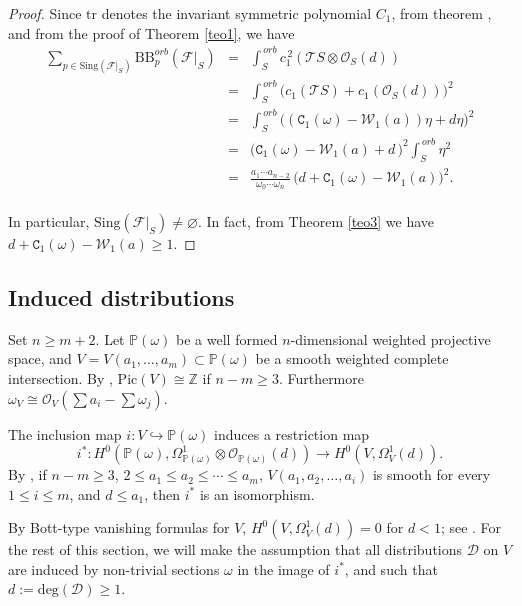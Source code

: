 \documentclass[11pt]{amsart}
\theoremstyle{plain}
\theoremstyle{definition}
\begin{document}
\begin{proof} 
Since $\mathrm{tr}$ denotes the invariant symmetric polynomial $C_1$,
from theorem \cite[Theorem 1]{Mig}, and from the proof of Theorem \ref{teo1}, we have 
\begin{eqnarray*}
\sum_{p\in\mathrm{Sing}\left(\mathcal{F}|_S\right)}\mathrm{BB}_p^{orb}(\mathcal{F}|_S)
&=&\int_S^{\,orb} c_1^{\,2}\left(\mathcal{T}S\otimes\mathcal{O}_S(d)\right)\\
&=&\int_S^{\,orb} \big(c_1(\mathcal{T}S)+c_1(\mathcal{O}_S(d))\big)^2\\
&=&\int_S^{\,orb} \big((\texttt{C}_1(\omega)-\mathcal{W}_1(a))\eta+d\eta\big)^2\\
&=&\big(\texttt{C}_1(\omega)-\mathcal{W}_1(a)+d\,\big)^2\int_S^{\,orb}\eta^2\\
&=&\frac{a_1\cdots a_{n-2}}{\omega_0\cdots\omega_n}\,\big(d+\texttt{C}_1(\omega)-\mathcal{W}_1(a)\big)^2.
\end{eqnarray*}
\\
In particular, $\mathrm{Sing}(\mathcal{F}|_S)\neq\varnothing$. In fact, from Theorem \ref{teo3} we have 
$d+\texttt{C}_1(\omega)-\mathcal{W}_1(a)\geq 1$.
\end{proof}


\subsection{Induced distributions}

Set $n\geq m+2$.
Let $\mathbb{P}(\omega)$ be a well formed $n$-dimensional weighted projective space, 
and $V=V(a_1,\ldots,a_m)\subset\mathbb{P}(\omega)$ be a smooth weighted complete intersection.
By \cite[Theorem 3.2.4]{Do}, $\mbox{Pic}(V)\cong\mathbb{Z}$ if $n-m\geq3$. 
Furthermore $\omega_V\cong\mathcal{O}_V(\sum a_i-\sum \omega_j)$.

The inclusion map $i:V\hookrightarrow\mathbb{P}(\omega)$ induces a restriction map
$$i^{\ast}:H^{0}(\mathbb{P}(\omega),\Omega_{\mathbb{P}(\omega)}^1\otimes\mathcal{O}_{\mathbb{P}(\omega)}(d))
\rightarrow H^{0}(V,\Omega_{V}^1(d)).$$
By \cite[Proposition 5.4]{Ca}, if $n-m\geq3$, $2\leq a_1\leq a_2\leq\cdots\leq a_m$, $V(a_1,a_2,\ldots,a_i)$ is smooth 
for every $1\leq i\leq m$, and $d\leq a_1$, then $i^{\ast}$ is an isomorphism.

By Bott-type vanishing formulas for $V$, $H^{0}(V,\Omega_{V}^1(d))=0$ for $d<1$; 
see \cite[Satz 8.11]{Fle}. For the rest of this section, we will make the assumption that all distributions 
$\mathcal{D}$ on $V$ are induced by non-trivial sections $\omega$ in the image of $i^{\ast}$, 
and such that $d:=\mathrm{deg}(\mathcal{D})\geq1$.
\end{document}
